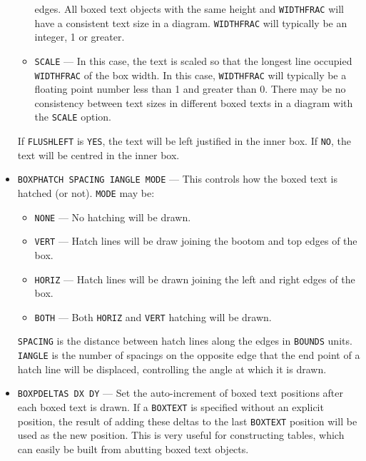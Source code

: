 \documentclass[a4paper,twoside,11pt]{article}
\newcommand{\textttc}[1]{\texttt{\textcolor{OurRed}{#1}}}
\begin{document}
\begin{itemize}
\begin{itemize}
    edges. All boxed text objects with the same height and \texttt{WIDTHFRAC} will have a consistent text size in a diagram.
    \texttt{WIDTHFRAC} will typically be an integer, 1 or greater.
  \item \texttt{SCALE} --- In this case, the text is scaled so that the longest line occupied \texttt{WIDTHFRAC} of the box width.
    In this case, \texttt{WIDTHFRAC} will typically be a floating point number less than 1 and greater than 0.
    There may be no consistency between text sizes in different boxed texts in a diagram with the \texttt{SCALE} option.
  \end{itemize}
  If \texttt{FLUSHLEFT} is \texttt{YES}, the text will be left justified in the inner box.
  If \texttt{NO}, the text will be centred in the inner box.
\item \textttc{BOXPHATCH SPACING IANGLE MODE} --- This controls how the boxed text is hatched (or not). \texttt{MODE} may be:
  \begin{itemize}
  \item \texttt{NONE} --- No hatching will be drawn.
  \item \texttt{VERT} --- Hatch lines will be draw joining the bootom and top edges of the box.
  \item \texttt{HORIZ} --- Hatch lines will be drawn joining the left and right edges of the box.
  \item \texttt{BOTH} --- Both \texttt{HORIZ} and \texttt{VERT} hatching will be drawn.
  \end{itemize}
  \texttt{SPACING} is the distance between hatch lines along the edges in \texttt{BOUNDS} units. \texttt{IANGLE} is the number of spacings
  on the opposite edge that the end point of a hatch line will be displaced, controlling the angle at which
  it is drawn.
\item \textttc{BOXPDELTAS DX DY} --- Set the auto-increment of boxed text positions after each boxed text is drawn. If a \texttt{BOXTEXT}
  is specified without an explicit position, the result of adding these deltas to the last \texttt{BOXTEXT} position will be
  used as the new position. This is very useful for constructing tables, which can easily be built from abutting boxed text objects.
\end{itemize}
\end{document}
